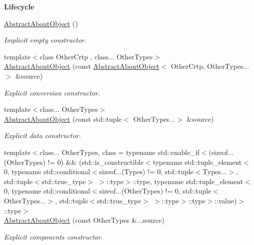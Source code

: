 \begin{Indent}{\bf Lifecycle}\par
\begin{DoxyCompactItemize}
\item 
\hyperlink{classmagrathea_1_1AbstractAboutObject_a52837c97e618f04d4b1f2374e3527787}{Abstract\-About\-Object} ()
\begin{DoxyCompactList}\small\item\em Implicit empty constructor. \end{DoxyCompactList}\item 
{\footnotesize template$<$class Other\-Crtp , class... Other\-Types$>$ }\\\hyperlink{classmagrathea_1_1AbstractAboutObject_adadb06230caa7430a5fb52ca6d2bc8e4}{Abstract\-About\-Object} (const \hyperlink{classmagrathea_1_1AbstractAboutObject}{Abstract\-About\-Object}$<$ Other\-Crtp, Other\-Types...$>$ \&source)
\begin{DoxyCompactList}\small\item\em Explicit conversion constructor. \end{DoxyCompactList}\item 
{\footnotesize template$<$class... Other\-Types$>$ }\\\hyperlink{classmagrathea_1_1AbstractAboutObject_a0d273885f8be2d218385c17f51b525f6}{Abstract\-About\-Object} (const std\-::tuple$<$ Other\-Types...$>$ \&source)
\begin{DoxyCompactList}\small\item\em Explicit data constructor. \end{DoxyCompactList}\item 
{\footnotesize template$<$class... Other\-Types, class  = typename std\-::enable\-\_\-if$<$(sizeof...(\-Other\-Types) != 0) \&\& (std\-::is\-\_\-constructible$<$typename std\-::tuple\-\_\-element$<$0, typename std\-::conditional$<$sizeof...(\-Types) != 0, std\-::tuple$<$\-Types...$>$, std\-::tuple$<$std\-::true\-\_\-type$>$ $>$\-::type$>$\-::type, typename std\-::tuple\-\_\-element$<$0, typename std\-::conditional$<$sizeof...(\-Other\-Types) != 0, std\-::tuple$<$\-Other\-Types...$>$, std\-::tuple$<$std\-::true\-\_\-type$>$ $>$\-::type$>$\-::type$>$\-::value)$>$\-::type$>$ }\\\hyperlink{classmagrathea_1_1AbstractAboutObject_a4b072950896c7c6f175d8675193d2a14}{Abstract\-About\-Object} (const Other\-Types \&...source)
\begin{DoxyCompactList}\small\item\em Explicit components constructor. \end{DoxyCompactList}\end{DoxyCompactItemize}
\end{Indent}
